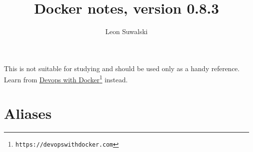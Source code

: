 \documentclass{charun}
\title{Docker notes, version 0.8.3}
\author{Leon Suwalski}
\begin{document}
\begin{multicols}{2}
\maketitle
\raggedright

This is not suitable for studying and should be used only as a handy reference.
Learn from \href{https://devopswithdocker.com}{Devops with Docker}\footnote{\texttt{https://devopswithdocker.com}} instead.









\section{Aliases}


\end{multicols}
\end{document}
